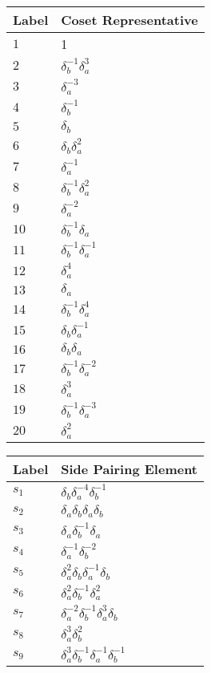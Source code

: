 \documentclass{article}
\begin{document}
\begin{center}
\begin{tabular}{ll}
\toprule
Label & Coset Representative\\
\midrule
$1$ & 1 \\
$2$ & $\delta_b^{-1}\delta_a^{3}$ \\
$3$ & $\delta_a^{-3}$ \\
$4$ & $\delta_b^{-1}$ \\
$5$ & $\delta_b^{}$ \\
$6$ & $\delta_b^{}\delta_a^{2}$ \\
$7$ & $\delta_a^{-1}$ \\
$8$ & $\delta_b^{-1}\delta_a^{2}$ \\
$9$ & $\delta_a^{-2}$ \\
$10$ & $\delta_b^{-1}\delta_a^{}$ \\
$11$ & $\delta_b^{-1}\delta_a^{-1}$ \\
$12$ & $\delta_a^{4}$ \\
$13$ & $\delta_a^{}$ \\
$14$ & $\delta_b^{-1}\delta_a^{4}$ \\
$15$ & $\delta_b^{}\delta_a^{-1}$ \\
$16$ & $\delta_b^{}\delta_a^{}$ \\
$17$ & $\delta_b^{-1}\delta_a^{-2}$ \\
$18$ & $\delta_a^{3}$ \\
$19$ & $\delta_b^{-1}\delta_a^{-3}$ \\
$20$ & $\delta_a^{2}$ \\
\bottomrule
\end{tabular}
\hfill
\begin{tabular}{ll}
\toprule
Label & Side Pairing Element\\
\midrule
$s_{1}$ & $\delta_b^{}\delta_a^{-4}\delta_b^{-1}$ \\
$s_{2}$ & $\delta_a^{}\delta_b^{}\delta_a^{}\delta_b^{}$ \\
$s_{3}$ & $\delta_a^{}\delta_b^{-1}\delta_a^{}$ \\
$s_{4}$ & $\delta_a^{-1}\delta_b^{-2}$ \\
$s_{5}$ & $\delta_a^{2}\delta_b^{}\delta_a^{-1}\delta_b^{}$ \\
$s_{6}$ & $\delta_a^{2}\delta_b^{-1}\delta_a^{2}$ \\
$s_{7}$ & $\delta_a^{-2}\delta_b^{-1}\delta_a^{3}\delta_b^{}$ \\
$s_{8}$ & $\delta_a^{3}\delta_b^{2}$ \\
$s_{9}$ & $\delta_a^{3}\delta_b^{-1}\delta_a^{-1}\delta_b^{-1}$ \\

\end{tabular}
\end{center}
\end{document}
